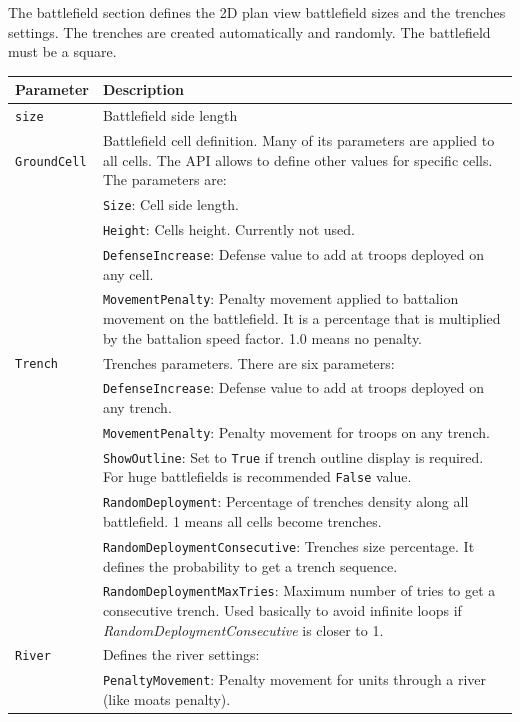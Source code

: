 \documentclass[tog]{acmsiggraph}
\begin{document}
The battlefield section defines the 2D plan view battlefield sizes and the trenches settings.
The trenches are created automatically and randomly.
The battlefield must be a square.

\begin{tabularx}{0.48\textwidth}{ |l|X| }
\hline 
\textbf{Parameter} & \textbf{Description} \\[0.15cm]
 \hline
 \texttt{size} & Battlefield side length \\
 \hline
 \texttt{GroundCell} & Battlefield cell definition. Many of its parameters are applied to all cells. The API allows to define other values for specific cells. The parameters are: \\
 & \quad\texttt{Size}: Cell side length. \\
 & \quad\texttt{Height}: Cells height. Currently not used. \\
 & \quad\texttt{DefenseIncrease}: Defense value to add at troops deployed on any cell. \\
 & \quad\texttt{MovementPenalty}: Penalty movement applied to battalion movement on the battlefield. It is a percentage that is multiplied by the battalion speed factor. 1.0 means no penalty. \\
 \hline
 \texttt{Trench} & Trenches parameters. There are six parameters: \\
 & \quad\texttt{DefenseIncrease}: Defense value to add at troops deployed on any trench.\\
 & \quad\texttt{MovementPenalty}: Penalty movement for troops on any trench.\\
 & \quad\texttt{ShowOutline}: Set to \texttt{True} if trench outline display is required. For huge battlefields is recommended \texttt{False} value. \\
 & \quad\texttt{RandomDeployment}: Percentage of trenches density along all battlefield. 1 means all cells become trenches. \\
 & \quad\texttt{RandomDeploymentConsecutive}: Trenches size percentage. It defines the probability to get a trench sequence. \\
 & \quad\texttt{RandomDeploymentMaxTries}: Maximum number of tries to get a consecutive trench. Used basically to avoid infinite loops if \textit{RandomDeploymentConsecutive} is closer to 1. \\
 \hline 
 \texttt{River} & Defines the river settings:\\
 & \quad\texttt{PenaltyMovement}: Penalty movement for units through a river (like moats penalty).\\
 \hline
\end{tabularx} 
\end{document}

